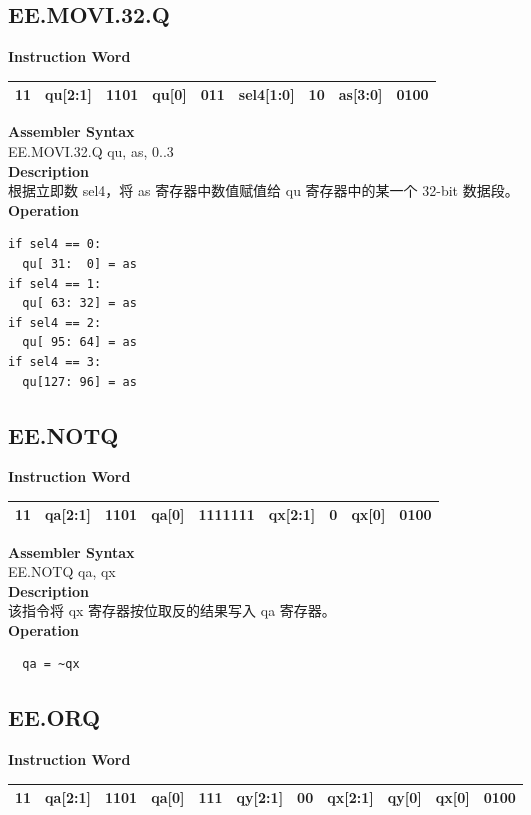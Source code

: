 \clearpage
\subsection{EE.MOVI.32.Q}\label{instruction:EEMOVI32Q}
\setlength\tabcolsep{6pt}
\textbf{Instruction Word} \\
\begin{tabular}{|c|c|c|c|c|c|c|c|c|}
	\hline
	11 & qu[2:1] & 1101 & qu[0] & 011 & sel4[1:0] & 10 & as[3:0] & 0100 \\
	\hline
\end{tabular}

\textbf{Assembler Syntax} \\
EE.MOVI.32.Q qu, as, 0..3 \\
\textbf{Description} \\
根据立即数 sel4，将 as 寄存器中数值赋值给 qu 寄存器中的某一个 32-bit 数据段。\\
\textbf{Operation}
\begin{lstlisting}
if sel4 == 0:
  qu[ 31:  0] = as
if sel4 == 1:
  qu[ 63: 32] = as
if sel4 == 2:
  qu[ 95: 64] = as
if sel4 == 3:
  qu[127: 96] = as
\end{lstlisting}

\clearpage
\subsection{EE.NOTQ}\label{instruction:EENOTQ}
\setlength\tabcolsep{6pt}
\textbf{Instruction Word} \\
\begin{tabular}{|c|c|c|c|c|c|c|c|c|}
	\hline
	11 & qa[2:1] & 1101 & qa[0] & 1111111 & qx[2:1] & 0 & qx[0] & 0100 \\
	\hline
\end{tabular}

\textbf{Assembler Syntax} \\
EE.NOTQ qa, qx \\
\textbf{Description} \\
该指令将 qx 寄存器按位取反的结果写入 qa 寄存器。\\
\textbf{Operation}
\begin{lstlisting}
  qa = ~qx
\end{lstlisting}

\clearpage
\subsection{EE.ORQ}\label{instruction:EEORQ}
\setlength\tabcolsep{6pt}
\textbf{Instruction Word} \\
\begin{tabular}{|c|c|c|c|c|c|c|c|c|c|c|}
	\hline
	11 & qa[2:1] & 1101 & qa[0] & 111 & qy[2:1] & 00 & qx[2:1] & qy[0] & qx[0] & 0100 \\
	\hline
\end{tabular}

